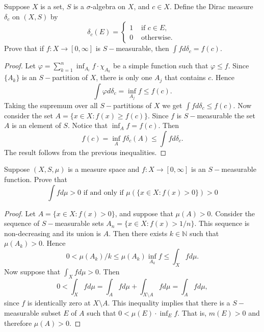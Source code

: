 \documentclass[14.5pt]{article}
\newcommand{\N}{\mathbb{N}}
\newenvironment{problem}[2][Problem]{\begin{mdframed}[backgroundcolor=gray!10, leftline = false, rightline=false, linewidth=0.25pt]  \begin{trivlist}
\item[\hskip \labelsep {\bfseries #1}\hskip \labelsep {\bfseries #2.}]}{\end{trivlist} \end{mdframed}  }
\begin{document}
\begin{problem}{3A.2}
    Suppose $X$ is a set, $S$ is a $\sigma$-algebra on $X$, and $c \in X$. Define the Dirac measure $\delta_c$ on $(X, S)$ by
    $$ \delta_c(E) = 
    \begin{cases}
    1 & \text{ if } c \in E,\\
    0 & \text{ otherwise. } 
    \end{cases}
    $$
    Prove that if $f: X \rightarrow [0, \infty]$ is $S-$measurable, then $\int f d\delta_c = f(c).$
\end{problem}
\begin{proof}
    Let $\varphi = \sum_{k=1}^n \inf_{A_i} f \cdot \chi_{A_k}$ be a simple function such that $\varphi \le f.$ Since $\{A_k\}$ is an $S-$partition of $X$, there is only one $A_j$ that contains $c.$ Hence
    $$\int \varphi d \delta_c = \inf_{A_j} f \le f(c).$$ Taking the supremum over all $S-$partitions of $X$ we get $\int f d\delta_c \le f(c).$
    Now consider the set $A = \{x \in X: f(x) \geq f(c)\}$. Since $f$ is $S-$measurable the set $A$ is an element of $S$. Notice that $\inf_A f = f(c).$ Then 
    $$f(c) =  \inf_A f \delta_c(A) \le \int f d\delta_c.$$
    The result follows from the previous inequalities. 
\end{proof}


\begin{problem}{3A.3} Suppose $(X, S, \mu)$ is a measure space and $f: X \rightarrow [0, \infty] $ is an $S-$measurable function. Prove that 
$$\int f d\mu > 0 \text{  if and only if   }   \mu(\{x \in X : f(x) > 0 \}) > 0 $$   
\end{problem}
\begin{proof}
    Let $A = \{x \in X : f(x) > 0 \}$, and suppose that $\mu(A) > 0.$ Consider the sequence of $S-$measurable sets $A_n = \{ x \in X: f(x) > 1/n\}$. This sequence is non-decreasing and its union is $A.$ Then there exists $k \in \N$ such that $\mu(A_k) > 0.$ Hence 
    $$0 <  \mu(A_k) / k  \leq \mu(A_k)\inf_{A_k} f \le \int_X f d\mu.$$
    Now suppose that $\int_X f d\mu > 0$. Then
    $$0 < \int_X f d\mu = \int_A f d\mu + \int_{X\setminus A} f d\mu = \int_A f d\mu,$$
    since $f$ is identically zero at ${X\setminus A}$. This inequality implies that there is a $S-$measurable subset $E$ of $A$ such that
    $0 < \mu(E) \cdot \inf_E f$. That is, $m(E) > 0$ and therefore $\mu(A) > 0.$
\end{proof}
\end{document}
